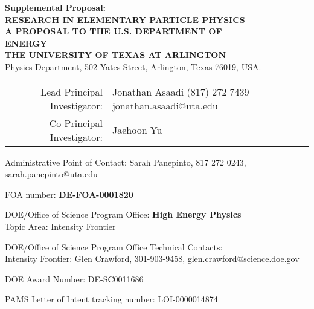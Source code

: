 \newpage
\begin{center}

{\Large\bf Supplemental Proposal: \\ RESEARCH IN ELEMENTARY PARTICLE PHYSICS}  \\
\vspace{.75in}
{\Large\bf A PROPOSAL TO THE U.S. DEPARTMENT OF} \\
\vspace*{0.15in}
{\Large\bf  ENERGY} \\
\vspace{0.5in}
{\Large\bf THE UNIVERSITY OF TEXAS AT ARLINGTON} \\
Physics Department, 502 Yates Street, Arlington, Texas 76019, USA.

\vspace{0.5in}
%
\begin{table}[htb]
\centering
\renewcommand{\arraystretch}{1.15}
\begin{tabular}{rl} %
    Lead Principal Investigator:    & Jonathan Asaadi  (817) 272 7439 jonathan.asaadi@uta.edu   \\
    Co-Principal Investigator:   & Jaehoon Yu                       \\

	\end{tabular}
\renewcommand{\arraystretch}{1.0}
\end{table}


Administrative Point of Contact: Sarah Panepinto, 817 272 0243, sarah.panepinto@uta.edu
\vspace*{0.15in}

FOA number:  \textbf{DE-FOA-0001820}
\vspace*{0.15in}

DOE/Office of Science Program Office: \textbf{High Energy Physics} \\
Topic Area: Intensity Frontier
\vspace*{0.15in}

DOE/Office of Science Program Office Technical Contacts:  \\
Intensity Frontier: Glen Crawford, 301-903-9458, glen.crawford@science.doe.gov  \\
\vspace*{0.15in}

DOE Award Number: DE-SC0011686

PAMS Letter of Intent tracking number:  LOI-0000014874
\vspace*{0.15in}


\vspace{.3in}
\end{center}
